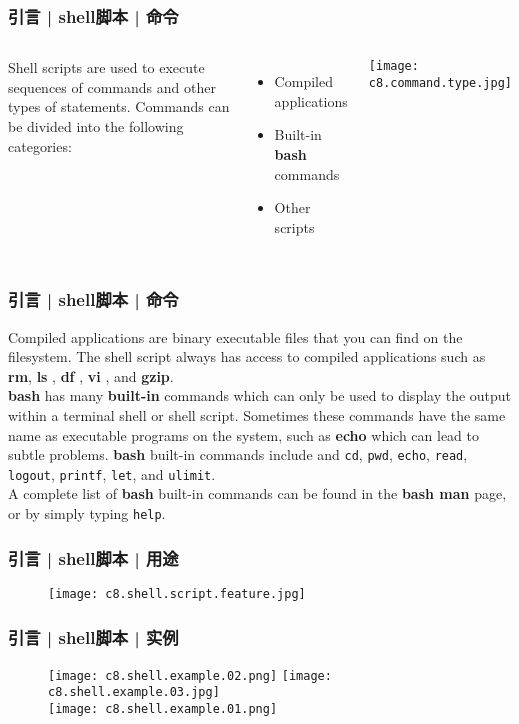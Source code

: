 \begin{frame}
  \frametitle{引言 | shell脚本 | 命令}
  \begin{columns}
  Shell scripts are used to execute sequences of commands and other types of statements. Commands can be divided into the following categories:
  \begin{itemize}
    \item Compiled applications
    \item Built-in \textbf{bash} commands
    \item Other scripts
  \end{itemize}
    \texttt{[image: c8.command.type.jpg]}
  \end{columns}
\end{frame}

\begin{frame}[fragile]
  \frametitle{引言 | shell脚本 | 命令}
  Compiled applications are binary executable files that you can find on
  the filesystem. The shell script always has access to compiled
  applications such as \textbf{rm}, \textbf{ls} , \textbf{df} ,
  \textbf{vi} , and \textbf{gzip}.\\
  \vspace{0.3cm}
  \textbf{bash} has many \textbf{built-in} commands which can only be used to display the output within a terminal shell or shell script. Sometimes these commands have the same name as executable programs on the system, such as \textbf{echo} which can lead to subtle problems. \textbf{bash} built-in commands include and \verb|cd|, \verb|pwd|, \verb|echo|, \verb|read|, \verb|logout|, \verb|printf|, \verb|let|, and \verb|ulimit|.\\
  \vspace{0.3cm}
  A complete list of \textbf{bash} built-in commands can be found in the \textbf{bash man} page, or by simply typing \verb|help|.
\end{frame}

\begin{frame}
  \frametitle{引言 | shell脚本 | 用途}
  \begin{figure}
    \centering
    \texttt{[image: c8.shell.script.feature.jpg]}
  \end{figure}
\end{frame}

\begin{frame}
  \frametitle{引言 | shell脚本 | 实例}
  \begin{figure}
    \centering
    \texttt{[image: c8.shell.example.02.png]}\quad
    \texttt{[image: c8.shell.example.03.jpg]}\\
    \vspace{0.5cm}
    \texttt{[image: c8.shell.example.01.png]}
  \end{figure}
\end{frame}

